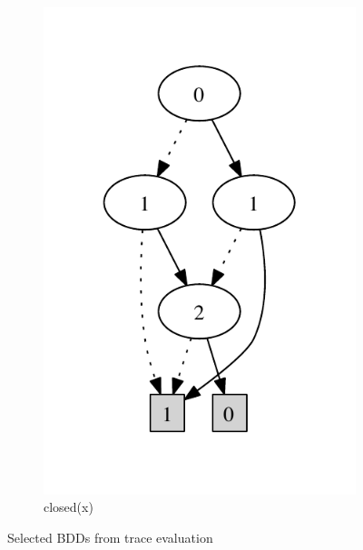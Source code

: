\begin{figure}
\begin{subfigure}[b]{0.25\textwidth}
        \includegraphics[width=\textwidth]{figures/bdd3.pdf}
        \caption{closed(x)}
        \label{fig:bdd3}
    \end{subfigure}
    \caption{Selected BDDs from trace evaluation}
    \label{fig:bdds}
\end{figure}

\fi

